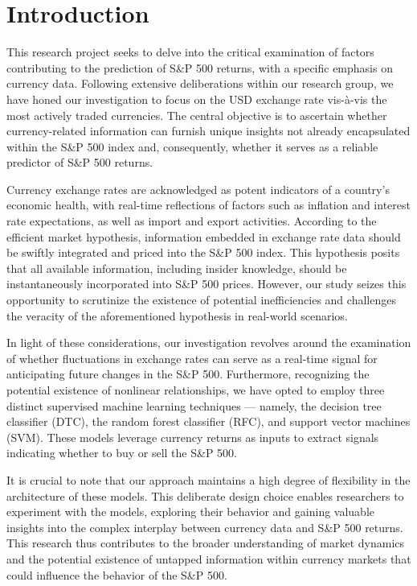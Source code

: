 \section{Introduction}
\label{Introduction}
This research project seeks to delve into the critical examination of factors contributing to the prediction of S\&P 500 returns, with a specific emphasis on currency data. Following extensive deliberations within our research group, we have honed our investigation to focus on the USD exchange rate vis-à-vis the most actively traded currencies. The central objective is to ascertain whether currency-related information can furnish unique insights not already encapsulated within the S\&P 500 index and, consequently, whether it serves as a reliable predictor of S\&P 500 returns.

Currency exchange rates are acknowledged as potent indicators of a country's economic health, with real-time reflections of factors such as inflation and interest rate expectations, as well as import and export activities. According to the efficient market hypothesis, information embedded in exchange rate data should be swiftly integrated and priced into the S\&P 500 index. This hypothesis posits that all available information, including insider knowledge, should be instantaneously incorporated into S\&P 500 prices. However, our study seizes this opportunity to scrutinize the existence of potential inefficiencies and challenges the veracity of the aforementioned hypothesis in real-world scenarios.

In light of these considerations, our investigation revolves around the examination of whether fluctuations in exchange rates can serve as a real-time signal for anticipating future changes in the S\&P 500. Furthermore, recognizing the potential existence of nonlinear relationships, we have opted to employ three distinct supervised machine learning techniques — namely, the decision tree classifier (DTC), the random forest classifier (RFC), and support vector machines (SVM). These models leverage currency returns as inputs to extract signals indicating whether to buy or sell the S\&P 500.

It is crucial to note that our approach maintains a high degree of flexibility in the architecture of these models. This deliberate design choice enables researchers to experiment with the models, 
exploring their behavior and gaining valuable insights into the complex interplay between currency data and S\&P 500 returns. This research thus contributes to the broader understanding of market dynamics and the potential existence of untapped information within currency markets that could influence the behavior of the S\&P 500.

